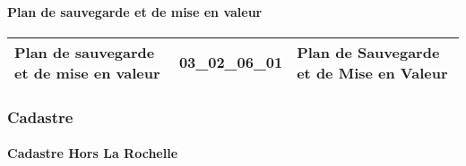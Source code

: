 \documentclass[12pt,titlepage,oneside]{book}
\begin{document}
\paragraph{Plan de sauvegarde et de mise en valeur}
\noindent
\vspace{\baselineskip}

\renewcommand{\arraystretch}{1.2}
\begin{supertabular}{|p{10cm}|c|p{15cm}|}
 Plan de sauvegarde et de mise en valeur & 03\_02\_06\_01 & Plan de Sauvegarde et de Mise en Valeur\\
\hline
\end{supertabular}

\subsubsection{\large Cadastre}
\paragraph{Cadastre Hors La Rochelle}
\noindent
\vspace{\baselineskip}
\end{document}
